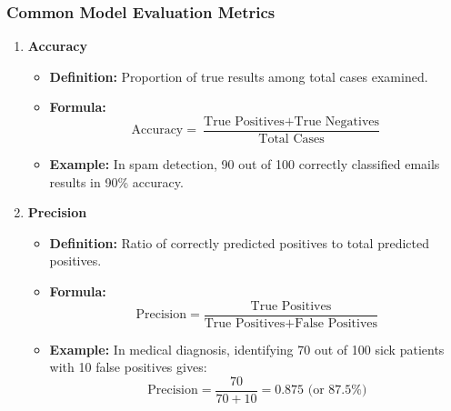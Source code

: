 \documentclass[aspectratio=169]{beamer}
\begin{document}
\begin{frame}[fragile]
    \frametitle{Common Model Evaluation Metrics}
    
    \begin{enumerate}
        \item \textbf{Accuracy}
        \begin{itemize}
            \item \textbf{Definition:} Proportion of true results among total cases examined.
            \item \textbf{Formula:} 
            \[
            \text{Accuracy} = \frac{\text{True Positives} + \text{True Negatives}}{\text{Total Cases}}
            \]
            \item \textbf{Example:} In spam detection, 90 out of 100 correctly classified emails results in 90\% accuracy.
        \end{itemize}
        
        \item \textbf{Precision}
        \begin{itemize}
            \item \textbf{Definition:} Ratio of correctly predicted positives to total predicted positives.
            \item \textbf{Formula:} 
            \[
            \text{Precision} = \frac{\text{True Positives}}{\text{True Positives} + \text{False Positives}}
            \]
            \item \textbf{Example:} In medical diagnosis, identifying 70 out of 100 sick patients with 10 false positives gives:
            \[
            \text{Precision} = \frac{70}{70 + 10} = 0.875 \text{ (or 87.5\%)}
            \]
        \end{itemize}
    \end{enumerate}
\end{frame}
\end{document}

